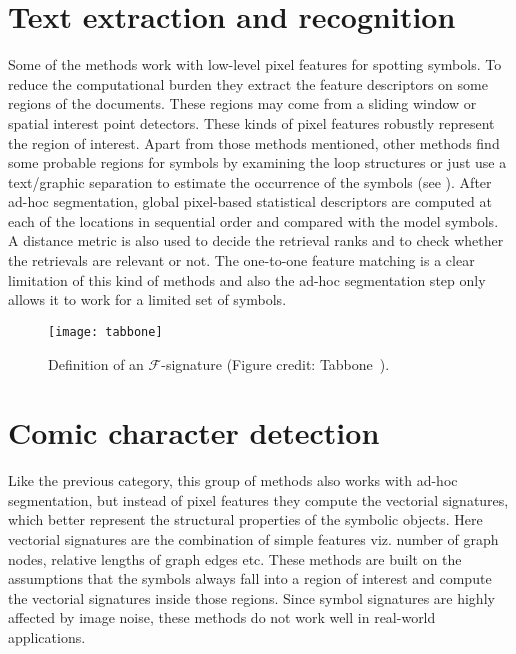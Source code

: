 \section{Text extraction and recognition}
\label{sec:sota-ss:raster}
Some of the methods work with low-level pixel features for spotting symbols. To reduce the computational burden they extract the feature descriptors on some regions of the documents. These regions may come from a sliding window or spatial interest point detectors. These kinds of pixel features robustly represent the region of interest. Apart from those methods mentioned, other methods find some probable regions for symbols by examining the loop structures \cite{Qureshi2007} or just use a text/graphic separation to estimate the occurrence of the symbols \cite{Tabbone2003} (see ). After ad-hoc segmentation, global pixel-based statistical descriptors \cite{Tabbone2003,Nguyen2009} are computed at each of the locations in sequential order and compared with the model symbols. A distance metric is also used to decide the retrieval ranks and to check whether the retrievals are relevant or not. The one-to-one feature matching is a clear limitation of this kind of methods and also the ad-hoc segmentation step only allows it to work for a limited set of symbols.
\begin{figure}
\begin{center}
\texttt{[image: tabbone]}
\end{center}
\caption{Definition of an $\mathcal{F}$-signature (Figure credit: Tabbone~\etal\cite{Tabbone2003}).}
\label{fig:sota-ss:tabbone}
\end{figure}

\section{Comic character detection}
\label{sec:sota-ss:symb-sign}
Like the previous category, this group of methods \cite{Dosch2004,Rusinol2006,Zhang2007} also works with ad-hoc segmentation, but instead of pixel features they compute the vectorial signatures, which better represent the structural properties of the symbolic objects. Here vectorial signatures are the combination of simple features viz. number of graph nodes, relative lengths of graph edges etc. These methods are built on the assumptions that the symbols always fall into a region of interest and compute the vectorial signatures inside those regions. Since symbol signatures are highly affected by image noise, these methods do not work well in real-world applications.

